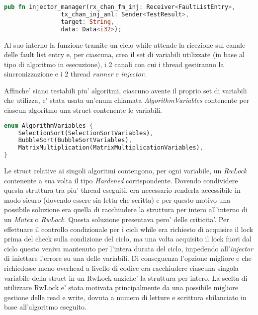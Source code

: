 \begin{lstlisting}[language=Rust, style=boxed]
pub fn injector_manager(rx_chan_fm_inj: Receiver<FaultListEntry>,
                tx_chan_inj_anl: Sender<TestResult>,
                target: String,
                data: Data<i32>);
\end{lstlisting}

Al suo interno la funzione tramite un ciclo while attende la ricezione sul canale delle fault list entry e, per ciascuna, crea il set di variabili utilizzate (in base al tipo di algoritmo in esecuzione), i 2 canali con cui i thread gestiranno la sincronizzazione e i 2 thread \textit{runner} e \textit{injector}.

Affinche' siano testabili piu' algoritmi, ciascuno avente il proprio set di variabili che utilizza, e' stata usata un'enum chiamata \textit{AlgorithmVariables} contenente per ciascun algoritmo una struct contenente le variabili.

\begin{lstlisting}[language=Rust, style=boxed]
enum AlgorithmVariables {
    SelectionSort(SelectionSortVariables),
    BubbleSort(BubbleSortVariables),
    MatrixMultiplication(MatrixMultiplicationVariables),
}
\end{lstlisting}

Le struct relative ai singoli algoritmi contengono, per ogni variabile, un \textit{RwLock} contenente a sua volta il tipo \textit{Hardened} corrispondente. Dovendo condividere questa struttura tra piu' thread eseguiti, era necessario renderla accessibile in modo sicuro (dovendo essere sia letta che scritta) e per questo motivo una possibile soluzione era quella di racchiudere la struttura per intero all'interno di un \textit{Mutex} o \textit{RwLock}. Questa soluzione presentava pero' delle criticita'. Per effettuare il controllo condizionale per i cicli while era richiesto di acquisire il lock prima del check sulla condizione del ciclo, ma una volta acquisito il lock fuori dal ciclo questo veniva mantenuto per l'intera durata del ciclo, impedendo all'\textit{injector} di iniettare l'errore su una delle variabili. Di conseguenza l'opzione migliore e che richiedesse meno overhead a livello di codice era racchiudere ciascuna singola variabile della struct in un RwLock anziche' la struttura per intero. La scelta di utilizzare RwLock e' stata motivata principalmente da una possibile migliore gestione delle read e write, dovuta a numero di letture e scrittura sbilanciato in base all'algoritmo eseguito.

